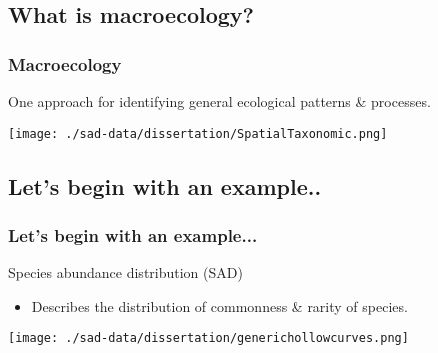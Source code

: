 \documentclass[14pt]{beamer}
\begin{document}
\subsection{What is macroecology?}
\begin{frame}[t]
\frametitle{Macroecology}
\normalsize One approach for identifying general ecological patterns \& processes.
\begin{center}
\texttt{[image: ./sad-data/dissertation/SpatialTaxonomic.png]}
\end{center}
\end{frame}

\subsection{Let's begin with an example..}
\begin{frame}
\frametitle{Let's begin with an example...}
Species abundance distribution (SAD)
\begin{itemize}
\item Describes the distribution of commonness \& rarity of species.
\end{itemize}
\begin{center}
\texttt{[image: ./sad-data/dissertation/generichollowcurves.png]}\\
\end{center}
\end{frame}
\end{document}

